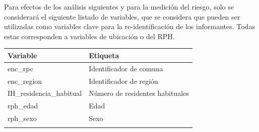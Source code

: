 \documentclass[]{book}
\theoremstyle{definition}
\theoremstyle{definition}
\theoremstyle{definition}
\theoremstyle{definition}
\theoremstyle{remark}
\begin{document}
Para efectos de los análisis siguientes y para la medición del riesgo, solo se considerará el siguiente listado de variables, que se considera que pueden ser utilizadas como variables clave para la re-identificación de los informantes. Todas estas corresponden a variables de ubicación o del RPH.

\begin{longtable}[]{@{}ll@{}}
\toprule
\begin{minipage}[b]{0.47\columnwidth}\raggedright
Variable\strut
\end{minipage} & \begin{minipage}[b]{0.47\columnwidth}\raggedright
Etiqueta\strut
\end{minipage}\tabularnewline
\midrule
\endhead
\begin{minipage}[t]{0.47\columnwidth}\raggedright
enc\_rpc\strut
\end{minipage} & \begin{minipage}[t]{0.47\columnwidth}\raggedright
Identificador de comuna\strut
\end{minipage}\tabularnewline
\begin{minipage}[t]{0.47\columnwidth}\raggedright
enc\_region\strut
\end{minipage} & \begin{minipage}[t]{0.47\columnwidth}\raggedright
Identificador de región\strut
\end{minipage}\tabularnewline
\begin{minipage}[t]{0.47\columnwidth}\raggedright
IH\_residencia\_habitual\strut
\end{minipage} & \begin{minipage}[t]{0.47\columnwidth}\raggedright
Número de residentes habituales\strut
\end{minipage}\tabularnewline
\begin{minipage}[t]{0.47\columnwidth}\raggedright
rph\_edad\strut
\end{minipage} & \begin{minipage}[t]{0.47\columnwidth}\raggedright
Edad\strut
\end{minipage}\tabularnewline
\begin{minipage}[t]{0.47\columnwidth}\raggedright
rph\_sexo\strut
\end{minipage} & \begin{minipage}[t]{0.47\columnwidth}\raggedright
Sexo\strut
\end{minipage}\tabularnewline
\begin{minipage}[t]{0.47\columnwidth}\raggedright

\end{minipage}
\end{longtable}
\end{document}

